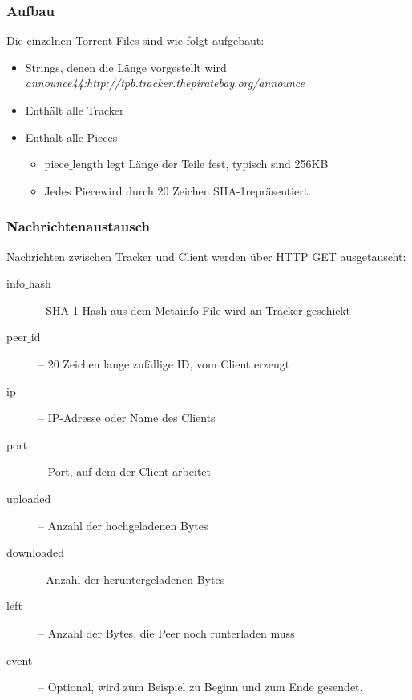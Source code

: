 \documentclass{article} %
\begin{document}
\subsubsection{Aufbau}	
Die einzelnen Torrent-Files sind wie folgt aufgebaut:
	\begin{itemize}
	\item Strings, denen die Länge vorgestellt wird\\
	\textit{announce44:http://tpb.tracker.thepiratebay.org/announce}
	\item Enthält alle Tracker
	\item Enthält alle \glqq Pieces\grqq
		\begin{itemize}
		\item piece$\_$length legt Länge der Teile fest, typisch sind 256KB
		\item Jedes \glqq Piece\grqq wird durch 20 Zeichen SHA-1repräsentiert. 
		\end{itemize}
	\end{itemize}
	
\subsubsection{Nachrichtenaustausch}
Nachrichten zwischen Tracker und Client werden über HTTP GET ausgetauscht:
	\begin{description}
	\item[info$\_$hash] - SHA-1 Hash aus dem Metainfo-File wird an Tracker geschickt
	\item[peer$\_$id] – 20 Zeichen lange zufällige ID, vom Client erzeugt
	\item[ip] – IP-Adresse oder Name des Clients
	\item[port] – Port, auf dem der Client arbeitet 
	\item[uploaded] – Anzahl der hochgeladenen Bytes
	\item[downloaded] -  Anzahl der heruntergeladenen Bytes
	\item[left] – Anzahl der Bytes, die Peer noch runterladen muss
	\item[event] – Optional, wird zum Beispiel zu Beginn und zum Ende gesendet.
	\end{description}
	
\end{document}
